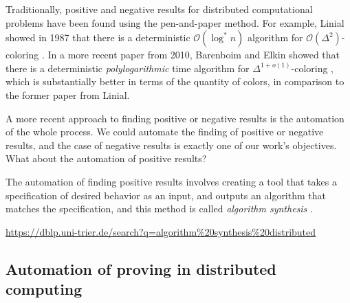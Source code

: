Traditionally, positive and negative results for distributed computational problems have been found using the pen-and-paper method.
For example, Linial showed in 1987 that there is a deterministic \(\mathcal{O}(\log^* n)\) algorithm for \(\mathcal{O}(\Delta^2)\)-coloring \cite{DBLP:conf/focs/Linial87}.
In a more recent paper from 2010, Barenboim and Elkin showed that there is a deterministic \emph{polylogarithmic} time algorithm for \(\Delta^{1 + o(1)}\)-coloring \cite{DBLP:conf/podc/BarenboimE10}, which is substantially better in terms of the quantity of colors, in comparison to the former paper \cite{DBLP:conf/focs/Linial87} from Linial.

A more recent approach to finding positive or negative results is the automation of the whole process.
We could automate the finding of positive or negative results, and the case of negative results is exactly one of our work's objectives.
What about the automation of positive results?

The automation of finding positive results involves creating a tool that takes a specification of desired behavior as an input, and outputs an algorithm that matches the specification, and this method is called \emph{algorithm synthesis} \cite{DBLP:phd/basesearch/Rybicki16}.

\url{https://dblp.uni-trier.de/search?q=algorithm%20synthesis%20distributed}





%
%
%
\subsection{Automation of proving in distributed computing} \label{sec:prior_work:title_b}

